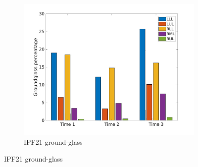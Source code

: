 \begin{figure}[H] 
\centering
\begin{subfigure}{.46\linewidth}%
  \includegraphics[width=\linewidth,trim={{.0\wd0} {.0\wd0} {.0\wd0} {.0\wd0}},clip]{Appendix/Image_AppexA/LobarDistribution/IPF21GroundglassLobarRegionDiseaseDistributionOverTime.jpg} %
  \caption{IPF21 ground-glass}
  \label{fig:IPF21LobarRegionDiseaseDistributionOverTime-a} 
\end{subfigure} 
\hspace{.3in}

\end{figure}
